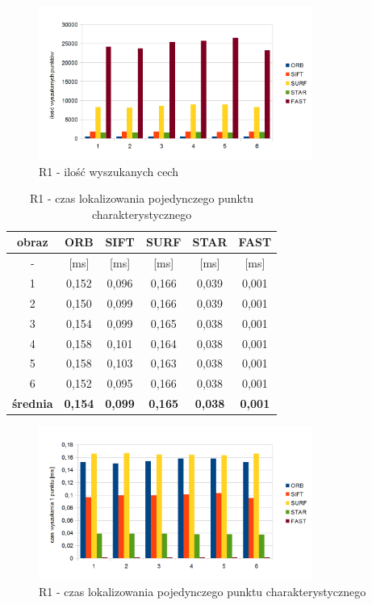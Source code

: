 \begin{figure}[!htbp]
\centering
\includegraphics[width=0.8\textwidth]{pict/slowik/r1/f1.png}
\caption{R1 - ilość wyszukanych cech}
\label{fig:r1_f1}
\end{figure}


\begin{table}[htbp]
  \centering
  \caption{R1 - czas lokalizowania pojedynczego punktu charakterystycznego}
    \begin{tabular}{|c|c|c|c|c|c|}
    \hline
    obraz & \textbf{ORB} & \textbf{SIFT} & \textbf{SURF} & \textbf{STAR} & \textbf{FAST} \\
    \hline
    -  & [ms] & [ms] & [ms] & [ms] & [ms] \\\hline
    1 & 0,152 & 0,096 & 0,166 & 0,039 & 0,001 \\
    2 & 0,150 & 0,099 & 0,166 & 0,039 & 0,001 \\
    3 & 0,154 & 0,099 & 0,165 & 0,038 & 0,001 \\
    4 & 0,158 & 0,101 & 0,164 & 0,038 & 0,001 \\
    5 & 0,158 & 0,103 & 0,163 & 0,038 & 0,001 \\
    6 & 0,152 & 0,095 & 0,166 & 0,038 & 0,001 \\\hline
    \textbf{średnia} & \textbf{0,154} & \textbf{0,099} & \textbf{0,165} & \textbf{0,038} & \textbf{0,001} \\
    \hline
    \end{tabular}%
  \label{tab:r1_f2}%
\end{table}%


\begin{figure}[htbp]
\centering
\includegraphics[width=0.8\textwidth]{pict/slowik/r1/f2.png}
\caption{R1 - czas lokalizowania pojedynczego punktu charakterystycznego}
\label{fig:r1_f2}
\end{figure}

